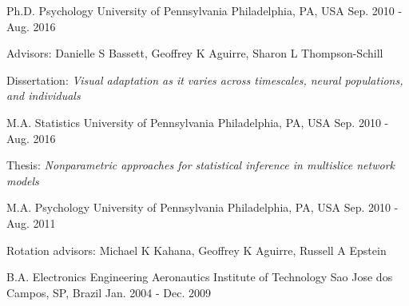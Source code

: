 \begin{cventries}
  \cventry
    {Ph.D. Psychology}
    {University of Pennsylvania}
    {Philadelphia, PA, USA}
    {Sep. 2010 - Aug. 2016}
    {
      \begin{cvitems}
        \item {Advisors: Danielle S Bassett, Geoffrey K Aguirre, Sharon L Thompson-Schill}
        \item {Dissertation: \textit{Visual adaptation as it varies across timescales, neural populations, and individuals}}
      \end{cvitems}
    }
  \cventry
    {M.A. Statistics}
    {University of Pennsylvania}
    {Philadelphia, PA, USA}
    {Sep. 2010 - Aug. 2016}
    {
      \begin{cvitems}
        \item {Thesis: \textit{Nonparametric approaches for statistical inference in multislice network models}}
      \end{cvitems}
    }
  \cventry
    {M.A. Psychology}
    {University of Pennsylvania}
    {Philadelphia, PA, USA}
    {Sep. 2010 - Aug. 2011}
    {
      \begin{cvitems}
        \item {Rotation advisors: Michael K Kahana, Geoffrey K Aguirre, Russell A Epstein}
      \end{cvitems}
    }
  \cventry
    {B.A. Electronics Engineering}
    {Aeronautics Institute of Technology}
    {Sao Jose dos Campos, SP, Brazil}
    {Jan. 2004 - Dec. 2009}
    {
    }
\end{cventries}
